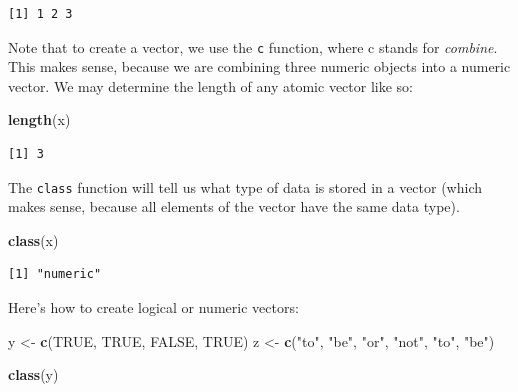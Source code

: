 \documentclass[
]{article}
\newenvironment{Shaded}{\begin{snugshade}}{\end{snugshade}}
\newcommand{\KeywordTok}[1]{\textcolor[rgb]{0.13,0.29,0.53}{\textbf{#1}}}
\newcommand{\NormalTok}[1]{#1}
\newcommand{\OtherTok}[1]{\textcolor[rgb]{0.56,0.35,0.01}{#1}}
\newcommand{\StringTok}[1]{\textcolor[rgb]{0.31,0.60,0.02}{#1}}
\begin{document}
\begin{verbatim}
[1] 1 2 3
\end{verbatim}

Note that to create a vector, we use the \texttt{c} function, where c stands for \emph{combine}.
This makes sense, because we are combining three numeric objects into a numeric vector.
We may determine the length of any atomic vector like so:

\begin{Shaded}
\begin{Highlighting}[]
\KeywordTok{length}\NormalTok{(x)}
\end{Highlighting}
\end{Shaded}

\begin{verbatim}
[1] 3
\end{verbatim}

The \texttt{class} function will tell us what type of data is stored in a vector (which makes sense, because all elements of the vector have the same data type).

\begin{Shaded}
\begin{Highlighting}[]
\KeywordTok{class}\NormalTok{(x)}
\end{Highlighting}
\end{Shaded}

\begin{verbatim}
[1] "numeric"
\end{verbatim}

Here's how to create logical or numeric vectors:

\begin{Shaded}
\begin{Highlighting}[]
\NormalTok{y <-}\StringTok{ }\KeywordTok{c}\NormalTok{(}\OtherTok{TRUE}\NormalTok{, }\OtherTok{TRUE}\NormalTok{, }\OtherTok{FALSE}\NormalTok{, }\OtherTok{TRUE}\NormalTok{)}
\NormalTok{z <-}\StringTok{ }\KeywordTok{c}\NormalTok{(}\StringTok{"to"}\NormalTok{, }\StringTok{"be"}\NormalTok{, }\StringTok{"or"}\NormalTok{, }\StringTok{"not"}\NormalTok{, }\StringTok{"to"}\NormalTok{, }\StringTok{"be"}\NormalTok{) }
\end{Highlighting}
\end{Shaded}

\begin{Shaded}
\begin{Highlighting}[]
\KeywordTok{class}\NormalTok{(y)}
\end{Highlighting}
\end{Shaded}
\end{document}
